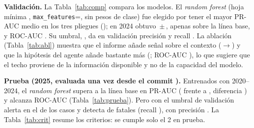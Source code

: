 \documentclass[conference]{IEEEtran}
\begin{document}
\textbf{Validación.} La Tabla~\ref{tab:comp} compara los modelos. El \emph{random forest} (hoja mínima \CifraRFHojas{},
\texttt{max\_features}=\CifraRFMaxFeat{}, sin pesos de clase) fue elegido por tener el mayor PR-AUC medio en los tres pliegues
(\CifraValPRMovil{}); en 2024 obtuvo \CifraValPR{}\,$\pm$\,\CifraValPRsd{}, apenas \CifraValDifPR{} sobre la línea base, y ROC-AUC
\CifraValROC{}. Su umbral, \CifraUmbral{}, da en validación precisión \CifraValPrec{} y recall \CifraValRec{}. La ablación
(Tabla~\ref{tab:abl}) muestra que el informe añade señal sobre el contexto (\CifraAblContexto{}$\to$\CifraAblReporte{}) y que la
hipótesis del agente añade bastante más (\CifraAblHipotesis{}; ROC-AUC \CifraAblHipotesisROC{}), lo que sugiere que el techo
proviene de la información disponible y no de la capacidad del modelo.

\begin{table}[t]
\caption{Validación (2024, variables \texttt{reporte}; media $\pm$ desv. de 5 semillas; «mov.» = media de los 3 pliegues de origen móvil)}\label{tab:comp}
\centering\resizebox{\columnwidth}{!}{}
\end{table}
\begin{table}[t]
\caption{Ablación: PR-AUC en validación 2024 por conjunto de variables}\label{tab:abl}
\centering\resizebox{0.9\columnwidth}{!}{}
\end{table}

\textbf{Prueba (2025, evaluada una vez desde el commit \texttt{\CifraCommitFinal}).} Entrenados con 2020--2024, el \emph{random
forest} supera a la línea base en PR-AUC (\CifraTestPR{} frente a \CifraTestBasePR{}, diferencia \CifraTestDifPR{}) y alcanza ROC-AUC
\CifraTestROC{} \CifraTestROCic{} (Tabla~\ref{tab:prueba}). Pero con el umbral de validación alerta en el \CifraTestAlerta{} de los
casos y detecta \CifraTestTP{} de \CifraFatTest{} fatales (recall \CifraTestRec{}), con precisión \CifraTestPrec{}. La
Tabla~\ref{tab:crit} resume los criterios: se cumple solo el 2 en prueba.

\begin{table}[t]
\caption{Prueba 2025 ($n=\CifraNTest$, \CifraFatTest{} fatales). Debajo de cada valor, IC 95\,\% por \emph{bootstrap} (1.000 remuestreos)}\label{tab:prueba}
\centering\small
\end{table}
\begin{table}[t]
\caption{Criterios de éxito predeclarados}\label{tab:crit}
\centering\resizebox{\columnwidth}{!}{}
\end{table}
\end{document}
